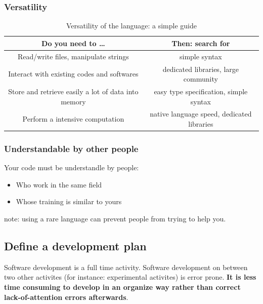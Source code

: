 \documentclass[11pt]{article}
\begin{document}
			\subsubsection{Versatility}

				\begin{table}[h!]
					\centering
					\begin{tabular}{|c|c|}

						\hline
						\textbf{Do you need to \ldots}       & \textbf{Then: search for}                 \\
						\hline
						\hline
						Read/write files, manipulate strings                    & simple syntax                                 \\
						Interact with existing codes and softwares              & dedicated libraries, large community          \\
						Store and retrieve easily a lot of data into memory     & easy type specification, simple syntax        \\
						Perform a intensive computation                         & native language speed, dedicated libraries    \\
						\hline

					\end{tabular}
					\caption{Versatility of the language: a simple guide}
				\end{table}

			\subsubsection{Understandable by other people}
				Your code must be understandle by people:
				\begin{itemize}
					\item Who work in the same field
					\item Whose training is similar to yours
				\end{itemize}
				note: using a rare language can prevent people from trying to help you.

		\subsection{Define a development plan}
			Software development is a full time activity. Software development on  between two other activites (for instance: experimental activites) is error prone.
            \textbf{It is less time consuming to develop in an organize way rather than correct lack-of-attention errors afterwards}.
\end{document}
